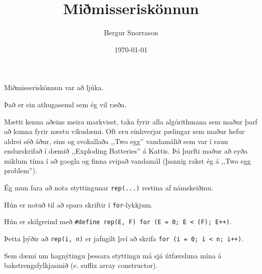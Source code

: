 \title{Miðmisseriskönnun}
\author{Bergur Snorrason}
\date{\today}



\frame{\titlepage}

{
	{
		\item<1-> Miðmisseriskönnun var að ljúka.
		\item<2-> Það er ein athugasemd sem ég vil ræða.
	}
}

{
	Mætti kenna aðeins meira markvisst, taka fyrir alla algórithmana sem maður þarf að kunna fyrir næstu vikudæmi.
	Oft eru einhverjar pælingar sem maður hefur aldrei séð áður,
	eins og svokallaða ,,Two egg'' vandamálið sem var í raun endurskrifað í dæmið ,,Exploding Batteries'' á Kattis.
	Þá þurfti maður að eyða miklum tíma í að googla og finna svipað vandamál (þannig rakst ég á ,,Two egg problem'').
}

{
}

{
	{
		\item<1-> Ég mun fara að nota styttingunar \texttt{rep(...)} restina af námskeiðinu.
		\item<2-> Hún er notuð til að spara skriftir í \texttt{for}-lykkjum.
		\item<3-> Hún er skilgreind með \texttt{\#define rep(E, F) for (E = 0; E < (F); E++)}.
		\item<4-> Þetta þýðir að \texttt{rep(i, n)} er jafngilt því að skrifa \texttt{for (i = 0; i < n; i++)}.
		\item<5-> Sem dæmi um hagnýtingu þessara styttingu má sjá útfærsluna mína á bakstrengsfylkjasmið (e. suffix array constructor).
	}
}

{
}

{
}


